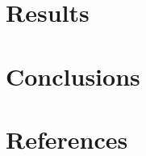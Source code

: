 \documentclass[12pt]{article}
\begin{document}
\section{Results}

\section{Conclusions}

\section{References}



\end{document}
